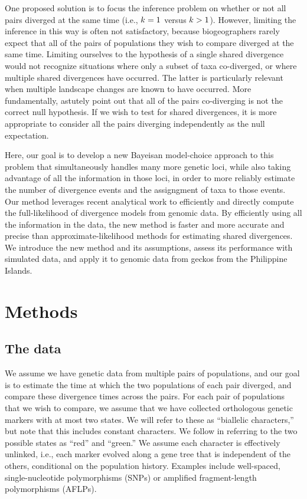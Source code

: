 One proposed solution is to focus the inference problem on whether or not all
pairs diverged at the same time (i.e., $k_{} = 1$ versus
$k_{} > 1$)\citep{Hickerson2013}.
However, limiting the inference in this way is often not satisfactory, because
biogeographers rarely expect that all of the pairs of populations they wish
to compare diverged at the same time.
Limiting ourselves to the hypothesis of a single shared divergence would not
recognize situations where only a subset of taxa co-diverged, or where multiple
shared divergences have occurred.
The latter is particularly relevant when multiple landscape changes are known
to have occurred.
More fundamentally,
\citet{Papadopoulou2016}
astutely point out that all of the pairs co-diverging is not the correct null
hypothesis.
If we wish to test for shared divergences, it is more appropriate to consider
all the pairs diverging independently as the null expectation.

Here, our goal is to develop a new Bayeisan model-choice approach to this
problem that simultaneously handles many more genetic loci, while also taking
advantage of all the information in those loci, in order to more reliably
estimate the number of divergence events and the assigngment of taxa to those
events.
Our method leverages recent analytical work \citep{Bryant2012} to efficiently
and directly compute the full-likelihood of divergence models from genomic
data.
By efficiently using all the information in the data, the new method is faster
and more accurate and precise than approximate-likelihood methods for
estimating shared divergences.
We introduce the new method and its assumptions, assess its performance with
simulated data, and apply it to genomic data from geckos from the Philippine
Islands.


\section{Methods}

\subsection{The data}
We assume we have genetic data from multiple pairs of populations, and our goal
is to estimate the time at which the two populations of each pair diverged, and
compare these divergence times across the pairs.
For each pair of populations that we wish to compare, we assume that we have
collected orthologous genetic markers with at most two states.
We will refer to these as ``biallelic characters,'' but note that this includes
constant characters.
We follow \citet{Bryant2012} in referring to the two possible
states as ``red'' and ``green.''
We assume each character is effectively unlinked, i.e., each marker evolved
along a gene tree that is independent of the others, conditional on the
population history.
Examples include well-spaced, single-nucleotide polymorphisms (SNPs) or
amplified fragment-length polymorphisms (AFLPs).

